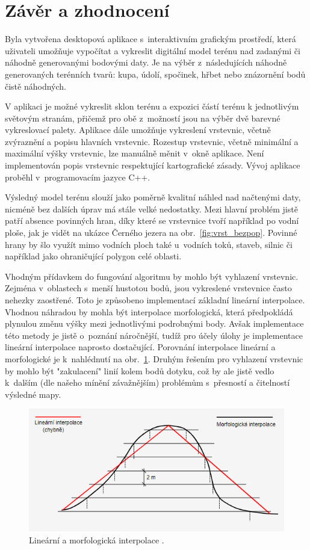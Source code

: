 \documentclass[a4paper, 12pt, oneside, titlepage]{article} %
\begin{document}
\section{Závěr a zhodnocení}
Byla vytvořena desktopová aplikace s~interaktivním grafickým prostředí, která uživateli umožňuje vypočítat a vykreslit digitální model terénu nad zadanými či náhodně generovanými bodovými daty. Je na výběr z~následujících náhodně generovaných terénních tvarů: kupa, údolí, spočinek, hřbet nebo znázornění bodů čistě náhodných. 

V aplikaci je možné vykreslit sklon terénu a expozici částí terénu k jednotlivým světovým stranám, přičemž pro obě z~možností jsou na výběr dvě barevné vykreslovací palety. Aplikace dále umožňuje vykreslení vrstevnic, včetně zvýraznění a popisu hlavních vrstevnic. Rozestup vrstevnic, včetně minimální a maximální výšky vrstevnic, lze manuálně měnit v~okně aplikace. Není implementován popis vrstevnic respektující kartografické zásady. Vývoj aplikace proběhl v~programovacím jazyce C++. 

Výsledný model terénu slouží jako poměrně kvalitní náhled nad načtenými daty, nicméně bez dalších úprav má stále velké nedostatky. Mezi hlavní problém jistě patří absence povinných hran, díky které se vrstevnice tvoří například po vodní ploše, jak je vidět na ukázce Černého jezera na obr.~\ref{fig:vrst_bezpop}. Povinné hrany by šlo využít mimo vodních ploch také u~vodních toků, staveb, silnic či například jako ohraničující polygon celé oblasti.

Vhodným přídavkem do fungování algoritmu by mohlo být vyhlazení vrstevnic. Zejména v~oblastech s~menší hustotou bodů, jsou vykreslené vrstevnice často nehezky zaostřené. Toto je způsobeno implementací základní lineární interpolace. Vhodnou náhradou by mohla být interpolace morfologická, která předpokládá plynulou změnu výšky mezi jednotlivými podrobnými body. Avšak implementace této metody je jistě o~poznání náročnější, tudíž pro účely úlohy je implementace lineární interpolace naprosto dostačující. Porovnání interpolace lineární a morfologické je k~nahlédnutí na obr.~\ref{fig:interpolace}. Druhým řešením pro vyhlazení vrstevnic by mohlo být "zakulacení" linií kolem bodů dotyku, což by ale jistě vedlo k~dalším (dle našeho mínění závažnějším) problémům s~přesností a čitelností výsledné mapy. 

 \begin{figure}[!htb]
	\centering
	\includegraphics[scale=0.8]{obrazky/interpolace.png} 
	\caption{Lineární a morfologická interpolace \cite{mapovani}.
	}
	\label{fig:interpolace}
\end{figure} 
\FloatBarrier
\end{document}
